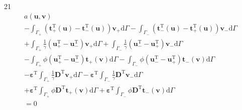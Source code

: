 \documentclass[a4paper,12pt]{article}
\begin{document}
21
\begin{equation}
\begin{split}
a(\mathbf{u},\mathbf{v})
\\-
\int_{\Gamma_+}
(\mathbf{t}_+^\textrm{T}(\mathbf{u})-\mathbf{t}_-^\textrm{T}(\mathbf{u}))\mathbf{v}_+
\textrm{d}\Gamma
-
\int_{\Gamma_-}
(\mathbf{t}_-^\textrm{T}(\mathbf{u})-\mathbf{t}_+^\textrm{T}(\mathbf{u}))\mathbf{v}_-
\textrm{d}\Gamma
\\+
\int_{\Gamma_+}
\frac{1}{\gamma}
(\mathbf{u}_+^\textrm{T} - \mathbf{u}_-^\textrm{T})
\mathbf{v}_+
\textrm{d}\Gamma
+
\int_{\Gamma_-}
\frac{1}{\gamma}
(\mathbf{u}_-^\textrm{T} - \mathbf{u}_+^\textrm{T})
\mathbf{v}_-
\textrm{d}\Gamma
\\-
\int_{\Gamma_+}
\phi
(\mathbf{u}_+^\textrm{T} - \mathbf{u}_-^\textrm{T})
\mathbf{t}_+(\mathbf{v})
\textrm{d}\Gamma
-
\int_{\Gamma_-}
\phi
(\mathbf{u}_-^\textrm{T} - \mathbf{u}_+^\textrm{T})
\mathbf{t}_-(\mathbf{v})
\textrm{d}\Gamma
\\-
{\boldsymbol\varepsilon}^\textrm{T}
\int_{\Gamma_+}
\frac{1}{\gamma}
\mathbf{D}^\textrm{T}
\mathbf{v}_+
\textrm{d}\Gamma
-
{\boldsymbol\varepsilon}^\textrm{T}
\int_{\Gamma_-}
\frac{1}{\gamma}
\mathbf{D}^\textrm{T}
\mathbf{v}_-
\textrm{d}\Gamma
\\+
{\boldsymbol\varepsilon}^\textrm{T}
\int_{\Gamma_+}
\phi\mathbf{D}^\textrm{T}
\mathbf{t}_+(\mathbf{v})
\textrm{d}\Gamma
+
{\boldsymbol\varepsilon}^\textrm{T}
\int_{\Gamma_-}
\phi\mathbf{D}^\textrm{T}
\mathbf{t}_-(\mathbf{v})
\textrm{d}\Gamma
\\=
0
\end{split}
\end{equation}
\end{document}
